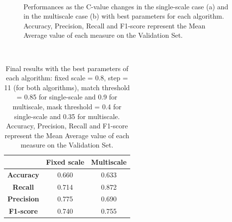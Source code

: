 \documentclass[a4paper,letterpaper, 11pt, onecolumn]{article} %
\begin{document}
\begin{figure}[h!]
\centering
{}\\
\caption{Performances as the C-value changes in the single-scale case (a) and in the multiscale case (b) with best parameters for each algorithm. Accuracy, Precision, Recall and F1-score represent the Mean Average value of each measure on the Validation Set.}
\label{fig:cvalue}
\end{figure}
\
\begin{table}[h!]
\centering
\begin{tabular}{c||c|c}
&\textbf{Fixed scale} & \textbf{Multiscale}\\
\hline \hline 
\textbf{Accuracy} &0.660 & 0.633\\
\textbf{Recall} &0.714  & 0.872\\
\textbf{Precision} & 0.775 & 0.690\\
\textbf{F1-score} & 0.740& 0.755\\
\end{tabular}
\caption{Final results with the best parameters of each algorithm: fixed scale = 0.8, step = 11 (for both algorithms), match threshold = 0.85 for single-scale and 0.9 for multiscale, mask threshold = 0.4 for single-scale and 0.35 for multiscale. Accuracy, Precision, Recall and F1-score represent the Mean Average value of each measure on the Validation Set. }
\label{tab:res}
\end{table}
\pagebreak
\end{document}
